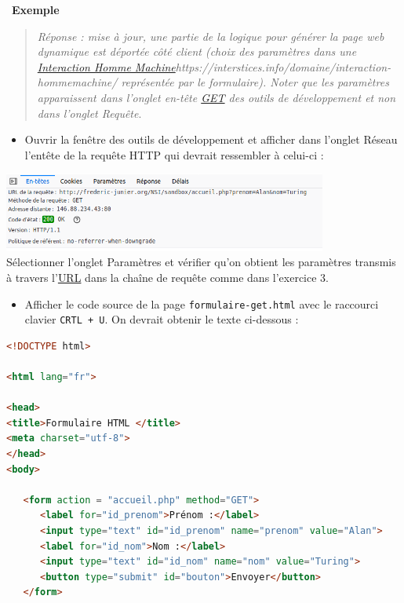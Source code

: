 \documentclass[
  11pt,
]{article}
\newcommand{\passthrough}[1]{#1}
\providecommand{\tightlist}{%
  \setlength{\itemsep}{0pt}\setlength{\parskip}{0pt}}
\newcounter{exple}
\newenvironment{exemple}[1]
{\par \medskip   \addtocounter{exple}{1} \noindent  
\begin{bclogo}[arrondi =0.1,   noborder = true, logo=\bclampe, marge=4]{~\textbf{Exemple} \textbf{\theexple} {\itshape #1} }  \par}
{
\end{bclogo}
 \par \bigskip }
\newcounter{logi}
\begin{document}
\begin{exemple}{}
\begin{enumerate}
  \begin{quote}
  \emph{Réponse : mise à jour, une partie de la logique pour générer la
  page web dynamique est déportée côté client (choix des paramètres dans
  une \href{}{Interaction Homme
  Machine}https://interstices.info/domaine/interaction-hommemachine/
  représentée par le formulaire). Noter que les paramètres apparaissent
  dans l'onglet en-tête \url{GET} des outils de développement et non
  dans l'onglet Requête}.
  \end{quote}

  \begin{itemize}
  \tightlist
  \item
    Ouvrir la fenêtre des outils de développement et afficher dans
    l'onglet Réseau l'entête de la requête HTTP qui devrait ressembler à
    celui-ci :
  \end{itemize}

  \includegraphics[width=0.8\textwidth,height=\textheight]{images/entete-get.png}\\

  Sélectionner l'onglet Paramètres et vérifier qu'on obtient les
  paramètres transmis à travers
  l'\href{https://developer.mozilla.org/fr/docs/Glossaire/URL}{URL} dans
  la chaîne de requête comme dans l'exercice 3.

  \begin{itemize}
  \tightlist
  \item
    Afficher le code source de la page
    \passthrough{\lstinline!formulaire-get.html!} avec le raccourci
    clavier \passthrough{\lstinline!CRTL + U!}. On devrait obtenir le
    texte ci-dessous :
  \end{itemize}

\begin{lstlisting}[language=HTML]
<!DOCTYPE html>

<html lang="fr">

<head>
<title>Formulaire HTML </title>
<meta charset="utf-8">    
</head> 
<body>

   <form action = "accueil.php" method="GET">        
      <label for="id_prenom">Prénom :</label>
      <input type="text" id="id_prenom" name="prenom" value="Alan">
      <label for="id_nom">Nom :</label>
      <input type="text" id="id_nom" name="nom" value="Turing">
      <button type="submit" id="bouton">Envoyer</button>
   </form>


\end{lstlisting}
\end{enumerate}
\end{exemple}
\end{document}

